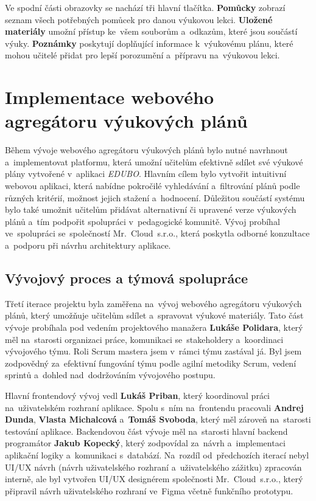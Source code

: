 \documentclass[male,czech,api_bc]{kitheses}
\begin{document}
Ve spodní části obrazovky se nachází tři hlavní tlačítka. \textbf{Pomůcky} zobrazí seznam všech potřebných pomůcek pro danou výukovou lekci. \textbf{Uložené materiály} umožní přístup ke~všem souborům a~odkazům, které jsou součástí výuky. \textbf{Poznámky} poskytují doplňující informace k~výukovému plánu, které mohou učitelé přidat pro lepší porozumění a~přípravu na~výukovou lekci.


\section{Implementace webového agregátoru výukových plánů}

Během vývoje webového agregátoru výukových plánů bylo nutné navrhnout a~implementovat platformu, která umožní učitelům efektivně sdílet své výukové plány vytvořené v~aplikaci \textit{EDUBO}. Hlavním cílem bylo vytvořit intuitivní webovou aplikaci, která nabídne pokročilé vyhledávání a~filtrování plánů podle různých kritérií, možnost jejich stažení a~hodnocení. Důležitou součástí systému bylo také umožnit učitelům přidávat alternativní či upravené verze výukových plánů a~tím podpořit spolupráci v~pedagogické komunitě. Vývoj probíhal ve~spolupráci se~společností Mr.~Cloud~s.r.o., která poskytla odborné konzultace a~podporu při návrhu architektury aplikace.

\subsection{Vývojový proces a týmová spolupráce}

Třetí iterace projektu byla zaměřena na~vývoj webového agregátoru výukových plánů, který umožňuje učitelům sdílet a~spravovat výukové materiály. Tato část vývoje probíhala pod vedením projektového manažera \textbf{Lukáše Polidara}, který měl na~starosti organizaci práce, komunikaci se~stakeholdery a~koordinaci vývojového týmu. Roli Scrum mastera jsem v~rámci týmu zastával já. Byl jsem zodpovědný za~efektivní fungování týmu podle agilní metodiky Scrum, vedení sprintů a~dohled nad~dodržováním vývojového postupu.

Hlavní frontendový vývoj vedl \textbf{Lukáš Priban}, který koordinoval práci na~uživatelském rozhraní aplikace. Spolu s~ním na~frontendu pracovali \textbf{Andrej Dunda}, \textbf{Vlasta Michalcová} a~\textbf{Tomáš Svoboda}, který měl zároveň na~starosti testování aplikace. Backendovou část vývoje měl na~starosti hlavní backend programátor \textbf{Jakub Kopecký}, který zodpovídal za~návrh a~implementaci aplikační logiky a~komunikaci s~databází. Na~rozdíl od~předchozích iterací nebyl UI/UX návrh (návrh uživatelského rozhraní a~uživatelského zážitku) zpracován interně, ale byl vytvořen UI/UX designérem společnosti Mr.~Cloud~s.r.o., který připravil návrh uživatelského rozhraní ve~Figma včetně funkčního prototypu.
\end{document}
